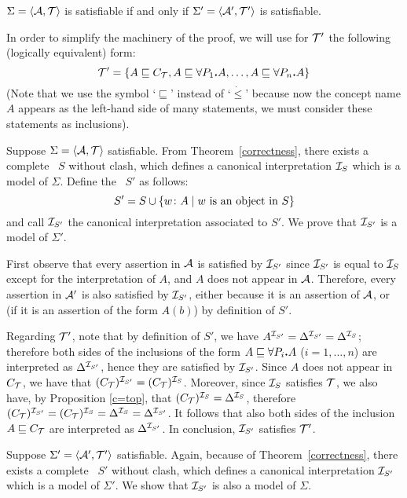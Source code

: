 \begin{theorem}
$\Sigma=\langle{\cal A},{\cal T}\rangle$ is satisfiable if and only if
$\Sigma'=\langle{\cal A}',{\cal T}'\rangle$ 
is satisfiable.
\end{theorem}
%
\proof
In order to simplify the machinery of the proof, we will use for ${\cal T}'$ the
following (logically equivalent) form: $${\cal T}' = \{A \sqsubseteq C_{\cal T}, A \sqsubseteq \forall P_1 \mbox{\bf .} A,\dots,A \sqsubseteq \forall P_n \mbox{\bf .} A\}$$ (Note that we use the symbol
`$\sqsubseteq$' instead of `$\dot\leq$' because now the
concept name $A$ appears as the left-hand side of many statements, we must
consider these statements as inclusions).

\Onlyif
Suppose $\Sigma=\langle{\cal A},{\cal T}\rangle$ satisfiable. From
Theorem~\ref{correctness},  there exists a complete \cs\ $S$ without clash,
which defines a canonical interpretation ${{\cal I}_S}$ which is a model of $\Sigma$.
Define the \cs\ $S'$ as follows:
	$$S'=S\cup\{w\colon A \mid \mbox{$w$ is an object in $S$}\}$$ 
and call ${\cal I}_{S'}$ the canonical interpretation associated to $S'$. We prove that ${\cal I}_{S'}$
is a model of $\Sigma'$. 

First observe that every assertion in ${\cal A}$ is satisfied by ${\cal I}_{S'}$
since ${\cal I}_{S'}$ is equal to ${{\cal I}_S}$ except for the interpretation of
$A$, and $A$ does not appear in ${\cal A}$. Therefore, 
every assertion in ${\cal A}'$ is also satisfied by ${\cal I}_{S'}$, either because it is an
assertion of ${\cal A}$, or (if it is an assertion of the form $A(b)$) by definition of $S'$. 

Regarding ${\cal T}'$,
note that by definition of $S'$, we have
$A^{{\cal I}_{S'}}=\Delta^{{\cal I}_{S'}}=\Delta^{{\cal I}_S}$; therefore both sides of the inclusions of the form $A \sqsubseteq \forall P_i \mbox{\bf .} A$ ($i=1,\dots,n$) are
interpreted as $\Delta^{{\cal I}_{S'}}$, hence they are satisfied by ${\cal I}_{S'}$.
Since $A$ does not appear in $C_{\cal T}$, we have that
$(C_{\cal T})^{{\cal I}_{S'}}=(C_{\cal T})^{{\cal I}_{S}}$.
Moreover, since ${{\cal I}_S}$ satisfies ${\cal T}$, we also have, by Proposition \ref{c=top}, that $(C_{{\cal T}})^{{\cal I}_S}=\Delta^{{\cal I}_S}$,
therefore $(C_{\cal T})^{{\cal I}_{S'}}=(C_{\cal T})^{{\cal I}_S}=\Delta^{{\cal I}_S}=\Delta^{{\cal I}_{S'}}$.
It follows that also both sides of the inclusion $A \sqsubseteq C_{\cal T}$ are interpreted as $\Delta^{{\cal I}_{S'}}$. In conclusion, ${\cal I}_{S'}$ satisfies ${\cal T}'$.

\If
Suppose $\Sigma'=\langle{\cal A}',{\cal T}'\rangle$ satisfiable.  
Again, because of Theorem~\ref{correctness},  there exists a complete \cs\ $S'$
without clash, which defines a canonical interpretation ${\cal I}_{S'}$ which is a
model of $\Sigma'$. We show that ${\cal I}_{S'}$ is also a model of $\Sigma$.

